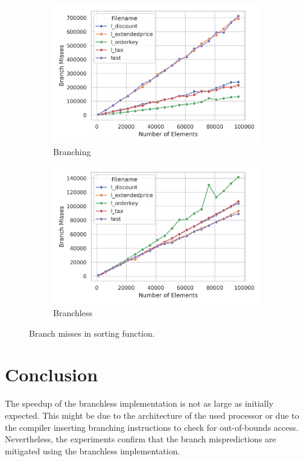 \documentclass[a4paper,10pt]{article}
\begin{document}
\begin{figure}[htbp]
    \centering
    \begin{subfigure}[b]{0.40\textwidth}
        \centering
        \includegraphics[width=\textwidth]{../graphs/branching_misses.png}
        \caption{Branching}
        \label{fig:misses_branching}
    \end{subfigure}
    \begin{subfigure}[b]{0.40\textwidth}
        \centering
        \includegraphics[width=\textwidth]{../graphs/condition-assign_misses.png}
        \caption{Branchless}
        \label{fig:misses_branchless}
    \end{subfigure}
    \caption{Branch misses in sorting function.}
    \label{fig:misses}
\end{figure}

\section{Conclusion}

The speedup of the branchless implementation is not as large as initially expected. 
This might be due to the architecture of 
the used processor or due to the compiler inserting branching instructions to check for
out-of-bounds access. Nevertheless, the experiments confirm that the branch mispredictions
are mitigated using the branchless implementation.
\end{document}
